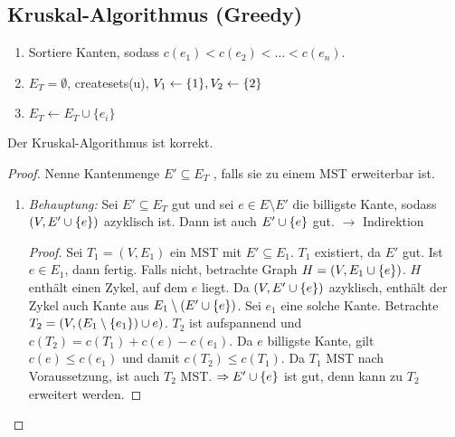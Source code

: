         \subsection{Kruskal-Algorithmus (Greedy)}
        \begin{enumerate}
            \item Sortiere Kanten, sodass $c(e_1) < c(e_2) < \dots < c(e_n)$.
            \item $E_T = \emptyset$, createsets(u), $V_1 \leftarrow \{1\}, V_2 \leftarrow \{2\}$
            \item
            	\begin{algorithmic}
            				\State $E_T\gets E_T\cup \{e_i\}$
            			\EndIf
            		\EndFor
            	\end{algorithmic}
        \end{enumerate}

        \begin{satz}
            Der Kruskal-Algorithmus ist korrekt.
            \begin{proof} %
                Nenne Kantenmenge $E' \subseteq E_T$ , falls sie zu einem MST erweiterbar ist.
                \begin{enumerate}
                    \item \emph{Behauptung:} Sei $E' \subseteq E_T$ gut und sei $e \in E \setminus E'$ die billigste Kante, sodass $(V, E' \cup \{e\})$ azyklisch ist. Dann ist auch $E' \cup \{e\}$ gut. $\to$ Indirektion
                    \begin{proof}%
                        Sei $T_1 = (V, E_1)$ ein MST mit $E' \subseteq E_1$. $T_1$ existiert, da $E'$ gut. Ist $e \in E_1$, dann fertig. Falls nicht, betrachte Graph $H = (V, E_1 \cup \{e\})$. $H$ enthält einen Zykel, auf dem $e$ liegt. Da $(V, E' \cup \{e\})$ azyklisch, enthält der Zykel auch Kante aus $E_1 \setminus (E' \cup \{e\})$. Sei $e_1$ eine solche Kante. Betrachte $T_2 = (V, (E_1 \setminus \{e_1\}) \cup{e})$. $T_2$ ist aufspannend und $c(T_2) = c(T_1) + c(e) - c(e_1)$. Da $e$ billigste Kante, gilt $c(e) \le c(e_1)$ und damit $c(T_2) \le c(T_1)$. Da $T_1$ MST nach Voraussetzung, ist auch $T_2$ MST. $\implies E' \cup \set{e}$ ist gut, denn kann zu $T_2$ erweitert werden.
                    \end{proof}
                \end{enumerate}
            \end{proof}
        \end{satz}
        
